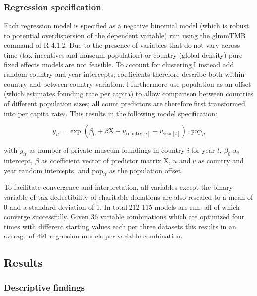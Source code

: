 \documentclass[11pt]{article}
\begin{document}
\subsubsection*{Regression specification}

Each regression model is specified as a negative binomial model (which is robust to potential overdispersion of the dependent variable) run using the glmmTMB command \parencite{Brooks_etal_2017_glmmTMB} of R 4.1.2. 
Due to the presence of variables that do not vary across time (tax incentives and museum population) or country (global density) pure fixed effects models are not feasible. 
To account for clustering I instead add random country and year intercepts; coefficients therefore describe both within-country and between-country variation. 
I furthermore use population as an offset (which estimates founding rate per capita) to allow comparison between countries of different population sizes; all count predictors are therefore first transformed into per capita rates.
This results in the following model specification:

\begin{equation*}
y_{it} = \exp(\beta_0 + \beta \text{X} + u_{\text{country}[i]} + v_{\text{year}[t]}) \cdot \text{pop}_{it}
\end{equation*}

with \(y_{it}\) as number of private museum foundings in country \(i\) for year \(t\), \(\beta_0\) as intercept, \(\beta\) as coefficient vector of predictor matrix \(\text{X}\), \(u\) and \(v\) as country and year random intercepts, and \(\text{pop}_{it}\) as the population offset.


To facilitate convergence and interpretation, all variables except the binary variable of tax deductibility of charitable donations are also rescaled to a mean of 0 and a standard deviation of 1. 
In total 212 115 models are run, all of which converge successfully. 
Given 36 variable combinations which are optimized four times with different starting values each per three datasets this results in an average of 491 regression models per variable combination.



\subsection*{Results}


\subsubsection*{Descriptive findings}
\end{document}
